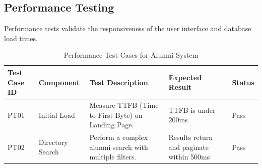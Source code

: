 \subsection{Performance Testing}
Performance tests validate the responsiveness of the user interface and database load times.

\begin{table}[H]
    \centering
    \small
    \begin{tabular}{|l|l|p{6cm}|p{5cm}|l|}
        \hline
        \textbf{Test Case ID} & \textbf{Component} & \textbf{Test Description} & \textbf{Expected Result} & \textbf{Status} \\
        \hline
        PT01 & Initial Load & Measure TTFB (Time to First Byte) on Landing Page. & TTFB is under 200ms & Pass \\
        \hline
        PT02 & Directory Search & Perform a complex alumni search with multiple filters. & Results return and paginate within 500ms & Pass \\
        \hline
    \end{tabular}
    \caption{Performance Test Cases for Alumni System}
    \label{tab:performance_tests}
\end{table}
